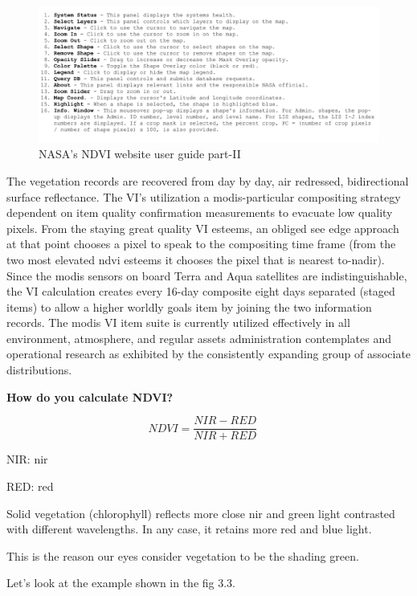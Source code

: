     
    \begin{figure}[H]
            \centering
            \includegraphics[width=1.0\linewidth]{figures/ch3/nasa_website_2.png}
            \caption{\label{fig:nasa_website_2} NASA's NDVI website user guide part-II}
    \end{figure}    


The vegetation records are recovered from day by day, air redressed, bidirectional surface reflectance. The VI's utilization a \gls{modis}-particular compositing strategy dependent on item quality confirmation measurements to evacuate low quality pixels. From the staying great quality VI esteems, an obliged see edge approach at that point chooses a pixel to speak to the compositing time frame (from the two most elevated \gls{ndvi} esteems it chooses the pixel that is nearest to-nadir). Since the \gls{modis} sensors on board Terra and Aqua satellites are indistinguishable, the VI calculation creates every 16-day composite eight days separated (staged items) to allow a higher worldly goals item by joining the two information records. The \gls{modis} VI item suite is currently utilized effectively in all environment, atmosphere, and regular assets administration contemplates and operational research as exhibited by the consistently expanding group of associate distributions. \\

\centerline{\textbf{How do you calculate NDVI?}}

\textbf{\[ NDVI = \frac{NIR - RED}{NIR + RED} \ \ \ 
\ \ \]}

\centerline{NIR: \gls{nir}}
\centerline{RED: \gls{red}}

Solid vegetation (chlorophyll) reflects more close \gls{nir} and green light contrasted with different wavelengths. In any case, it retains more red and blue light. 

This is the reason our eyes consider vegetation to be the shading green.

Let's look at the example shown in the fig 3.3.


